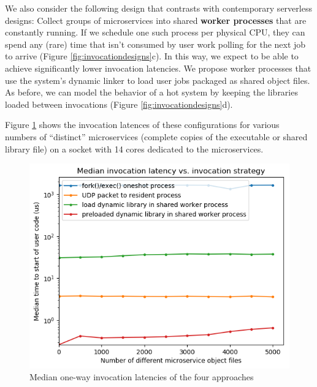 We also consider the following design that contrasts with contemporary serverless designs:
Collect groups of microservices into shared \textbf{worker processes} that are constantly running.
If we schedule one such process per physical CPU, they can spend any (rare) time that isn't consumed by user work polling for the next job to arrive (Figure \ref{fig:invocationdesigns}c).
In this way, we expect to be able to achieve significantly lower invocation latencies.
We propose worker processes that use the system's dynamic linker to load user jobs packaged as shared object files.
As before, we can model the behavior of a hot system by keeping the libraries loaded between invocations (Figure \ref{fig:invocationdesigns}d).

Figure \ref{fig:motive} shows the invocation latences of these configurations for various numbers of ``distinct'' microservices (complete copies of the executable or shared library file) on a socket with 14 cores dedicated to the microservices.


\begin{figure}
\includegraphics[width=\columnwidth]{figs/2017-01-31-motivation_numfuns-latency_log}
\caption{Median one-way invocation latencies of the four approaches}
\label{fig:motive}
\end{figure}

